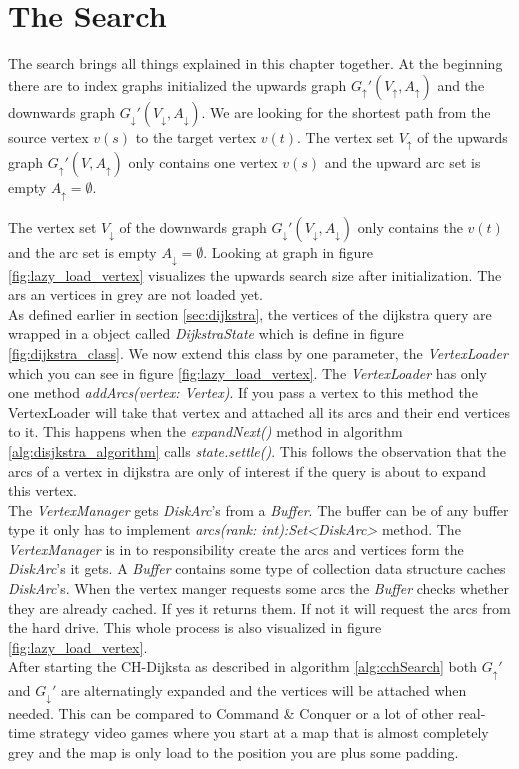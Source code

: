 \section{The Search}

The search brings all things explained in this chapter together.
At the beginning there are to index graphs initialized the upwards graph $G_\uparrow'(V_\uparrow, A_\uparrow)$ and the downwards graph $G_\downarrow'(V_\downarrow, A_\downarrow)$.
We are looking for the shortest path from the source vertex $v(s)$ to the target vertex $v(t)$.
The vertex set $V_\uparrow$ of the upwards graph $G_\uparrow'(V, A_\uparrow)$ only contains one vertex $v(s)$ and the upward arc set is empty $A_\uparrow = \emptyset$.

The vertex set $V_\downarrow$ of the downwards graph $G_\downarrow'(V_\downarrow, A_\downarrow)$ only contains the $v(t)$ and the arc set is empty $A_\downarrow = \emptyset$.
Looking at graph in figure \ref{fig:lazy_load_vertex} visualizes the upwards search size after initialization.
The ars an vertices in grey are not loaded yet.
\\
As defined earlier in section \ref{sec:dijkstra}, the vertices of the dijkstra query are wrapped in a object called \textit{DijkstraState} which is define in figure \ref{fig:dijkstra_class}.
We now extend this class by one parameter, the \textit{VertexLoader} which you can see in figure \ref{fig:lazy_load_vertex}.
The \textit{VertexLoader} has only one method \textit{addArcs(vertex: Vertex)}.
If you pass a vertex to this method the VertexLoader will take that vertex and attached all its arcs and their end vertices to it.
This happens when the \textit{expandNext()} method in algorithm \ref{alg:disjkstra_algorithm} calls \textit{state.settle()}.
This follows the observation that the arcs of a vertex in dijkstra are only of interest if the query is about to expand this vertex.
\\
The \textit{VertexManager} gets \textit{DiskArc}'s from a \textit{Buffer}.
The buffer can be of any buffer type it only has to implement \textit{arcs(rank: int):Set<DiskArc>} method.
The \textit{VertexManager} is in to responsibility create the arcs and vertices form the \textit{DiskArc}'s it gets.
A \textit{Buffer} contains some type of collection data structure caches \textit{DiskArc}'s.
When the vertex manger requests some arcs the \textit{Buffer} checks whether they are already cached.
If yes it returns them.
If not it will request the arcs from the hard drive.
This whole process is also visualized in figure \ref{fig:lazy_load_vertex}.
\\
After starting the CH-Dijksta as described in algorithm \ref{alg:cchSearch} both $G_\uparrow'$ and $G_\downarrow'$ are alternatingly expanded and the vertices will be attached when needed.
This can be compared to Command \& Conquer or a lot of other real-time strategy video games where you start at a map that is almost completely grey and the map is only load to the position you are plus some padding.

